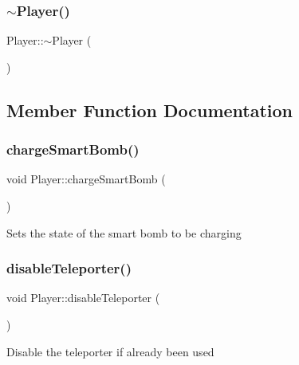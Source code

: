 \mbox{\label{class_player_a749d2c00e1fe0f5c2746f7505a58c062}} 
\subsubsection{\texorpdfstring{$\sim$\+Player()}{~Player()}}
{\footnotesize\ttfamily Player\+::$\sim$\+Player (\begin{DoxyParamCaption}{ }\end{DoxyParamCaption})}



\subsection{Member Function Documentation}
\mbox{\label{class_player_a2c704d0bed9de1dc0b3512113f42bb97}} 
\subsubsection{\texorpdfstring{charge\+Smart\+Bomb()}{chargeSmartBomb()}}
{\footnotesize\ttfamily void Player\+::charge\+Smart\+Bomb (\begin{DoxyParamCaption}{ }\end{DoxyParamCaption})}

Sets the state of the smart bomb to be charging \mbox{\label{class_player_a805a8d4ae2c5eddaee1ff7c716467f2c}} 
\subsubsection{\texorpdfstring{disable\+Teleporter()}{disableTeleporter()}}
{\footnotesize\ttfamily void Player\+::disable\+Teleporter (\begin{DoxyParamCaption}{ }\end{DoxyParamCaption})}

Disable the teleporter if already been used \mbox{\label{class_player_af9e361fd707a32d86ff1a0f75fb2c3b2}} 
